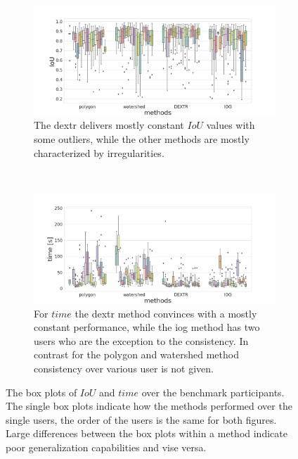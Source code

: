 \begin{figure} 
	\centering
	\begin{subfigure}[t]{1.0\textwidth}
		\centering
		\includegraphics[width=\textwidth]{figures/chap53_all_users_iou.png}
		\caption{
			The \gls{dextr} delivers mostly constant $ IoU $ values with some outliers, while the other methods are mostly characterized by irregularities.
		}\label{fig:ch5:sec3:all_benchmark_iou}
	\end{subfigure}
	\\
	\begin{subfigure}[t]{1.0\textwidth}
		\centering
		\includegraphics[width=\textwidth]{figures/chap53_all_users_time.png}
		\caption{
			For $ time $ the \gls{dextr} method convinces with a mostly constant performance, while the \gls{iog} method has two users who are the exception to the consistency.
			In contrast for the polygon and watershed method consistency over various user is not given.			
		} \label{fig:ch5:sec3:all_benchmark_time}
	\end{subfigure}
	\caption[Box plots of benchmark participants on $ IoU $ and $ time$.]{		
		The box plots of $ IoU $ and $ time $ over the \getNumberBenchmarkParticipants benchmark participants.
		The single box plots indicate how the methods performed over the single users, the order of the users is the same for both figures. 
		Large differences between the box plots within a method indicate poor generalization capabilities and vise versa.
	}\label{fig:ch5:sec3:all_benchmark}
\end{figure}

